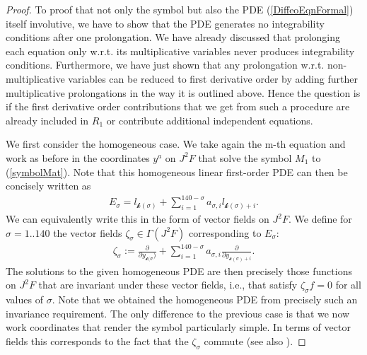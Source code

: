 \documentclass[a4paper,12pt, DIV=14, BCOR=5mm, twoside, headsepline, numbers=noenddot]{scrbook}
\begin{document}
\begin{proof}
To proof that not only the symbol but also the PDE (\ref{DiffeoEqnFormal}) itself involutive, we have to show that the PDE generates no integrability conditions after one prolongation. We have already discussed that prolonging each equation only w.r.t. its multiplicative variables never produces integrability conditions. Furthermore, we have just shown that any prolongation w.r.t. non-multiplicative variables can be reduced to first derivative order by adding further multiplicative prolongations in the way it is outlined above. Hence the question is if the first derivative order contributions that we get from such a procedure are already included in $R_1$ or contribute additional independent equations. 

We first consider the homogeneous case. We take again the m-th equation and work as before in the coordinates $y^a$ on $J^2F$ that solve the symbol $M_1$ to (\ref{symbolMat}). Note that this homogeneous linear first-order PDE can then be concisely written as
\begin{align}
    E_{\sigma} = l_{\mathcal{k}(\sigma)} + \sum_{i = 1}^{140-\sigma} a_{\sigma,i} l_{\mathcal{k}(\sigma)+i} .
\end{align}
We can equivalently write this in the form of vector fields on $J^2F$. We define for $\sigma = 1..140$ the vector fields $\zeta_{\sigma} \in \Gamma(J^2F) $ corresponding to $E_{\sigma}$:
\begin{align}
    \zeta_{\sigma} := \frac{\partial}{\partial y_{\mathcal{k}(\sigma})} + \sum_{i = 1}^{140-\sigma} a_{\sigma,i} \frac{\partial}{\partial y_{\mathcal{k}(\sigma)+i}}.
\end{align}
The solutions to the given homogeneous PDE are then precisely those functions on $J^2F$ that are invariant under these vector fields, i.e., that satisfy $\zeta_{\sigma} f = 0$ for all values of $\sigma$.
Note that we obtained the homogeneous PDE from precisely such an invariance requirement. The only difference to the previous case is that we now work coordinates that render the symbol particularly simple. 
In terms of vector fields this corresponds to the fact that the $\zeta_{\sigma}$ commute (see also \cite{seiler1994analysis}).
%
%
%


\end{proof}
\end{document}
